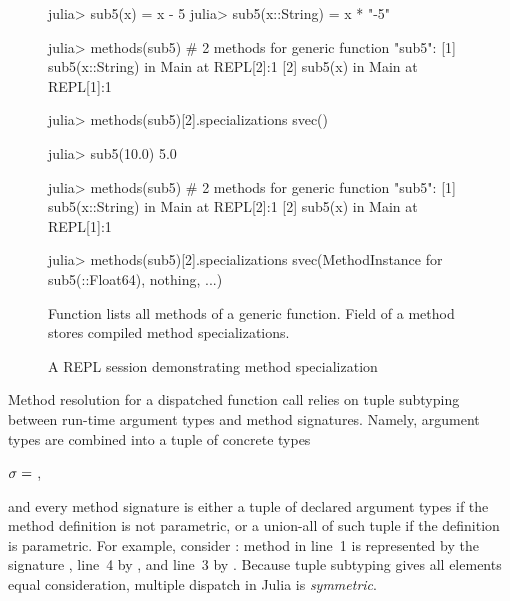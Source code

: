 \begin{figure}[t]
\centering
\begin{minipage}{10cm}
\begin{julia}
julia> sub5(x) = x - 5
julia> sub5(x::String) = x * "-5"

julia> methods(sub5)
# 2 methods for generic function "sub5":
[1] sub5(x::String) in Main at REPL[2]:1
[2] sub5(x) in Main at REPL[1]:1

julia> methods(sub5)[2].specializations
svec()

julia> sub5(10.0)
5.0

julia> methods(sub5)
# 2 methods for generic function "sub5":
[1] sub5(x::String) in Main at REPL[2]:1
[2] sub5(x) in Main at REPL[1]:1

julia> methods(sub5)[2].specializations
svec(MethodInstance for sub5(::Float64), nothing, ...)
\end{julia}
\end{minipage}
\caption{A REPL session demonstrating method specialization
}\label{fig:code:specializations}
\begin{tablenotes}[para]
\small
Function  lists all methods of a generic function.
Field  of a method stores compiled method specializations.
\end{tablenotes}
\end{figure}

Method resolution for a dispatched function call 
relies on tuple subtyping~\cite{bib:leavens:tuple-dispatch:1998}
between run-time argument types and method signatures.
Namely, argument types are combined into a tuple of concrete types
\begin{center}
  $\sigma =$ ,
\end{center}
and every method signature is either a tuple of declared argument types
if the method definition is not parametric, or a union-all of such tuple
if the definition is parametric.
For example, consider : method in line~1
is represented by the signature , line~4 by
, and line~3 by
.
Because tuple subtyping gives all elements equal consideration,
multiple dispatch in Julia is \emph{symmetric}.

